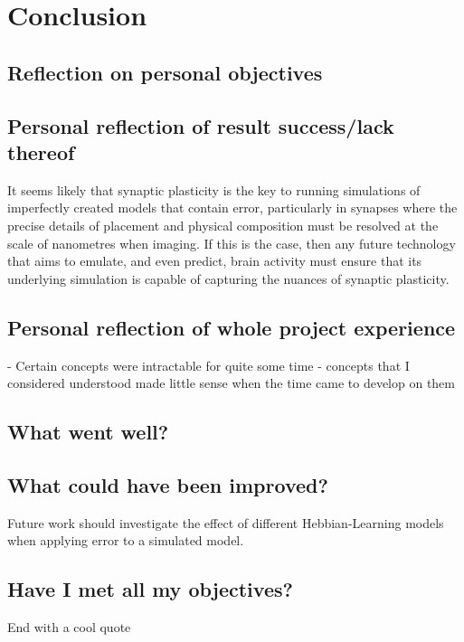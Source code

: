 \chapter{Conclusion}

\section{Reflection on personal objectives}

\section{Personal reflection of result success/lack thereof}

It seems likely that synaptic plasticity is the key to running simulations of
imperfectly created models that contain error, particularly in synapses where
the precise details of placement and physical composition must be resolved at
the scale of nanometres when imaging. If this is the case, then any future
technology that aims to emulate, and even predict, brain activity must ensure
that its underlying simulation is capable of capturing the nuances of synaptic plasticity.

\section{Personal reflection of whole project experience}
 - Certain concepts were intractable for quite some time 
 - concepts that I considered understood made little sense when the time came to
 develop on them 



\section{What went well?}

\section{What could have been improved?}

Future work should investigate the effect of different Hebbian-Learning models
when applying error to a simulated model.

\section{Have I met all my objectives?}

End with a cool quote